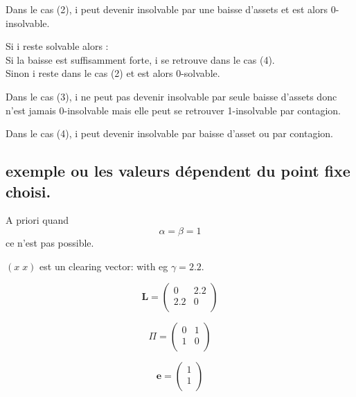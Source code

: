 \documentclass[11pt,oneside,twocolumn]{article}
\begin{document}
Dans le cas (2), i peut devenir insolvable par une baisse d'assets et est alors 0-insolvable.

Si i reste solvable alors :\\
Si la baisse est suffisamment forte, i se retrouve dans le cas (4).\\
Sinon i reste dans le cas (2) et est alors 0-solvable.

Dans le cas (3), i ne peut pas devenir insolvable par seule baisse d'assets donc n'est jamais 0-insolvable mais elle peut se retrouver 1-insolvable par contagion.

Dans le cas (4), i peut devenir insolvable par baisse d'asset ou par contagion.


\subsection{exemple ou les valeurs dépendent du point fixe choisi.}

A priori quand $$\alpha=\beta=1$$ ce n'est pas possible.

$(x\; x)$ est un clearing vector:
with eg $\gamma=2.2$.

\begin{equation*}
\textbf{L} =
\begin{pmatrix}
0 & 2.2 \\
2.2 & 0 \\
\end{pmatrix}
\end{equation*}

\begin{equation*}
\Pi =
\begin{pmatrix}
0 & 1 \\
1 & 0 \\
\end{pmatrix}
\end{equation*}

\begin{equation*}
\textbf{e} =
\begin{pmatrix}
1 \\
1 \\
\end{pmatrix}
\end{equation*}
\end{document}
